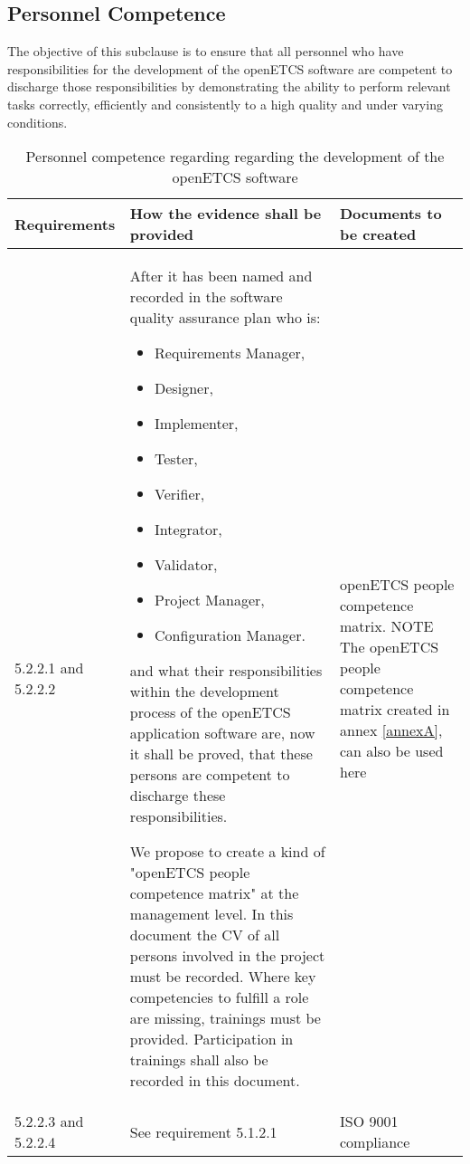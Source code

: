 \documentclass{template/openetcs_report}
\begin{document}
\subsection{Personnel Competence}
\begin{flushleft}
The objective of this subclause is to ensure that all personnel who have responsibilities for the development of the openETCS software are competent to discharge those responsibilities by demonstrating the ability to perform relevant tasks correctly, efficiently and consistently to a high quality and under varying conditions.
\end{flushleft}
{\footnotesize\sffamily\centering
\begin{longtable}{|p{2cm}|p{9cm}|p{3cm}|}
\caption{Personnel competence regarding regarding the development of the openETCS software}\\
\hline
\bfseries Requirements & \bfseries How the evidence shall be provided & \bfseries Documents to be created\\
\hline
\hline
\endhead
\hline
\endfoot

5.2.2.1 and 5.2.2.2 & After it has been named and recorded in the software quality assurance plan who is:
\begin{itemize}\itemsep=0pt
  \item Requirements Manager,
  \item Designer,
  \item Implementer,
  \item Tester,
  \item Verifier,
  \item Integrator,
  \item Validator,
  \item Project Manager,
  \item Configuration Manager.
\end{itemize}
and what their responsibilities within the development process of the openETCS application software are, now it shall be proved, that these persons are competent to discharge these responsibilities.

We propose to create a kind of "openETCS people competence matrix" at the management level. In this document the CV of all persons involved in the project must be recorded.
Where key competencies to fulfill a role are missing, trainings must be provided.
Participation in trainings shall also be recorded in this document.
& openETCS people competence matrix.
\linebreak
\linebreak
NOTE\linebreak
The openETCS people competence matrix created in annex \ref{annexA}, can also be used here\\ 
\hline
5.2.2.3 and 5.2.2.4 & See requirement 5.1.2.1 & ISO 9001 compliance\\ 
\hline
\end{longtable}}
\end{document}
